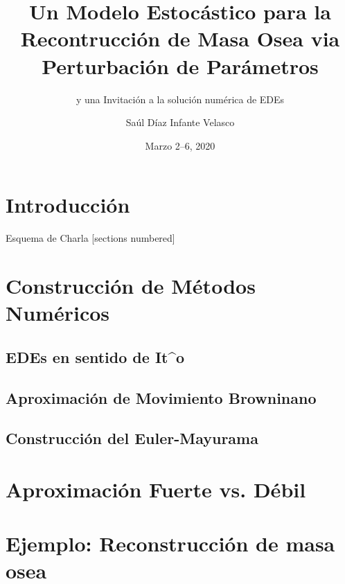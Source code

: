 \documentclass[10pt]{beamer}
\title{Un Modelo Estocástico para la Recontrucción de Masa Osea via Perturbaci\'on de Par\'ametros}
\subtitle{y una Invitaci\'on a la soluci\'on num\'erica de EDEs}
\date{Marzo 2--6, 2020}
\author{Sa\'ul D\'iaz Infante Velasco}
\institute{CONACYT-Universidad de Sonora}
\begin{document}
    \maketitle
    \section*{Introducci\'on}
        
    \begin{frame}{Esquema de Charla}
        [sections numbered]
        \tableofcontents[hideallsubsections]
    \end{frame}
    \section{Construcción de Métodos Numéricos}
        \subsection{EDEs en sentido de It^o}
            
            
        \subsection{Aproximaci\'on de Movimiento Browninano}
            
        \subsection{Construcci\'on del Euler-Mayurama}
        \section{Aproximaci\'on Fuerte vs. D\'ebil}
            
    \section{Ejemplo: Reconstrucción de masa osea}
        
        
        
        
        
        
        
\end{document}
